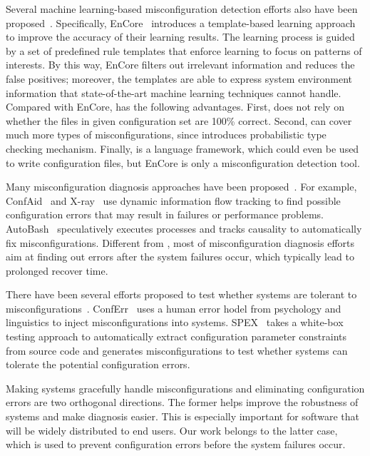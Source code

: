 Several machine learning-based misconfiguration detection efforts 
also have been proposed~\cite{yuan11context, zhang14encore}.
Specifically, EnCore~\cite{zhang14encore} introduces a template-based
learning approach to improve the accuracy of their learning results.
The learning process is guided by a set of predefined rule templates
that enforce learning to focus on patterns of interests.
By this way, EnCore filters out irrelevant information and reduces
the false positives; moreover, the templates are able to express
system environment information that state-of-the-art machine learning
techniques cannot handle.
Compared with EnCore, \app has the following advantages.
First, \app does not rely on whether the files in given configuration set 
are 100\% correct. Second, \app can cover much more types of 
misconfigurations, since \app introduces probabilistic type checking
mechanism. Finally, \app is a language framework, which could 
even be used to write configuration files, but EnCore is only a 
misconfiguration detection tool.

Many misconfiguration diagnosis approaches have been proposed~\cite{}.
For example, ConfAid~\cite{} and X-ray~\cite{} use dynamic information
flow tracking to find possible configuration errors that may result in
failures or performance problems. AutoBash~\cite{} speculatively
executes processes and tracks causality to automatically fix 
misconfigurations. Different from \app, most of misconfiguration
diagnosis efforts aim at finding out errors after the system
failures occur, which typically lead to prolonged recover time.

There have been several efforts proposed to test whether systems are 
tolerant to misconfigurations~\cite{xu13do}. 
ConfErr~\cite{} uses a human error hodel from psychology and
linguistics to inject misconfigurations into systems.
SPEX~\cite{xu13do} takes a white-box testing approach to automatically
extract configuration parameter constraints from source code and generates 
misconfigurations to test whether systems can tolerate the potential
configuration errors.

Making systems gracefully handle misconfigurations and eliminating
configuration errors are two orthogonal directions.
The former helps improve the robustness of systems and make 
diagnosis easier. This is especially important for 
software that will be widely distributed to end users.
Our work belongs to the latter case, which is used to 
prevent configuration errors before the system failures occur.
